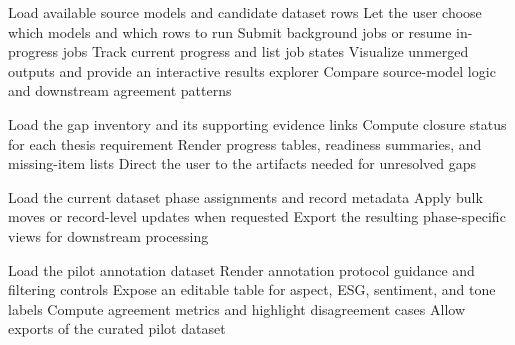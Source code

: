 \begin{algorithm}[H]
Load available source models and candidate dataset rows\;
Let the user choose which models and which rows to run\;
Submit background jobs or resume in-progress jobs\;
Track current progress and list job states\;
Visualize unmerged outputs and provide an interactive results explorer\;
Compare source-model logic and downstream agreement patterns\;
\caption{ClimateBERT Multi-Model Runner}
\label{alg:climatebert-multi-model-runner}
\end{algorithm}

\begin{algorithm}[H]
Load the gap inventory and its supporting evidence links\;
Compute closure status for each thesis requirement\;
Render progress tables, readiness summaries, and missing-item lists\;
Direct the user to the artifacts needed for unresolved gaps\;
\caption{Thesis Gap Closure Dashboard}
\label{alg:thesis-gap-closure-dashboard}
\end{algorithm}

\begin{algorithm}[H]
Load the current dataset phase assignments and record metadata\;
Apply bulk moves or record-level updates when requested\;
Export the resulting phase-specific views for downstream processing\;
\caption{Phase Dataset Suite}
\label{alg:phase-dataset-suite}
\end{algorithm}

\begin{algorithm}[H]
Load the pilot annotation dataset\;
Render annotation protocol guidance and filtering controls\;
Expose an editable table for aspect, ESG, sentiment, and tone labels\;
Compute agreement metrics and highlight disagreement cases\;
Allow exports of the curated pilot dataset\;
\caption{Ground Truth Workbench}
\label{alg:ground-truth-workbench}
\end{algorithm}

